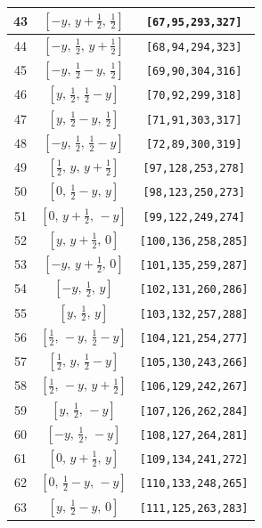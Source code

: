 \documentclass[fleqn,8pt]{jsarticle}
\begin{document}
\begin{longtable}{ccc}
43 & $\left[ - y,\, y + \frac{1}{2},\, \frac{1}{2} \right]$ & {\tt [67,95,293,327]} \\ \hline
44 & $\left[ - y,\, \frac{1}{2},\, y + \frac{1}{2} \right]$ & {\tt [68,94,294,323]} \\ \hline
45 & $\left[ - y,\, \frac{1}{2} - y,\, \frac{1}{2} \right]$ & {\tt [69,90,304,316]} \\ \hline
46 & $\left[ y,\, \frac{1}{2},\, \frac{1}{2} - y \right]$ & {\tt [70,92,299,318]} \\ \hline
47 & $\left[ y,\, \frac{1}{2} - y,\, \frac{1}{2} \right]$ & {\tt [71,91,303,317]} \\ \hline
48 & $\left[ - y,\, \frac{1}{2},\, \frac{1}{2} - y \right]$ & {\tt [72,89,300,319]} \\ \hline
49 & $\left[ \frac{1}{2},\, y,\, y + \frac{1}{2} \right]$ & {\tt [97,128,253,278]} \\ \hline
50 & $\left[ 0,\, \frac{1}{2} - y,\, y \right]$ & {\tt [98,123,250,273]} \\ \hline
51 & $\left[ 0,\, y + \frac{1}{2},\, - y \right]$ & {\tt [99,122,249,274]} \\ \hline
52 & $\left[ y,\, y + \frac{1}{2},\, 0 \right]$ & {\tt [100,136,258,285]} \\ \hline
53 & $\left[ - y,\, y + \frac{1}{2},\, 0 \right]$ & {\tt [101,135,259,287]} \\ \hline
54 & $\left[ - y,\, \frac{1}{2},\, y \right]$ & {\tt [102,131,260,286]} \\ \hline
55 & $\left[ y,\, \frac{1}{2},\, y \right]$ & {\tt [103,132,257,288]} \\ \hline
56 & $\left[ \frac{1}{2},\, - y,\, \frac{1}{2} - y \right]$ & {\tt [104,121,254,277]} \\ \hline
57 & $\left[ \frac{1}{2},\, y,\, \frac{1}{2} - y \right]$ & {\tt [105,130,243,266]} \\ \hline
58 & $\left[ \frac{1}{2},\, - y,\, y + \frac{1}{2} \right]$ & {\tt [106,129,242,267]} \\ \hline
59 & $\left[ y,\, \frac{1}{2},\, - y \right]$ & {\tt [107,126,262,284]} \\ \hline
60 & $\left[ - y,\, \frac{1}{2},\, - y \right]$ & {\tt [108,127,264,281]} \\ \hline
61 & $\left[ 0,\, y + \frac{1}{2},\, y \right]$ & {\tt [109,134,241,272]} \\ \hline
62 & $\left[ 0,\, \frac{1}{2} - y,\, - y \right]$ & {\tt [110,133,248,265]} \\ \hline
63 & $\left[ y,\, \frac{1}{2} - y,\, 0 \right]$ & {\tt [111,125,263,283]} \\ \hline

\end{longtable}
\end{document}
